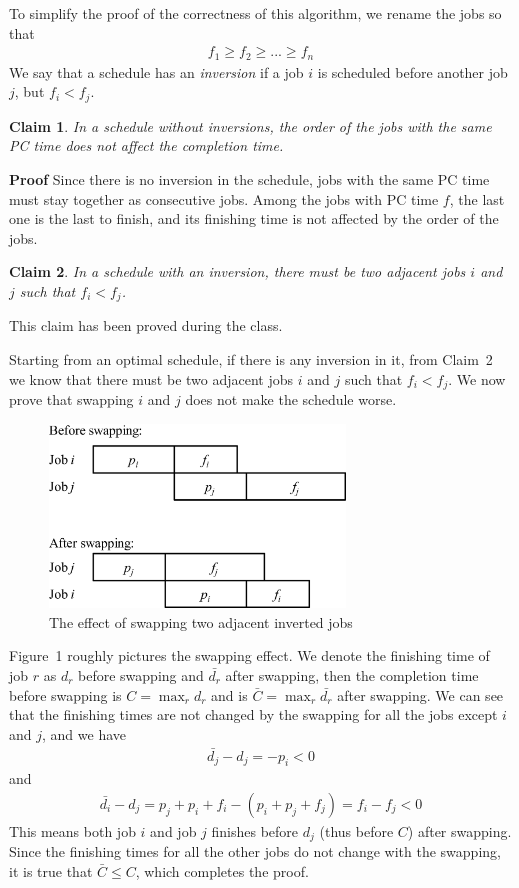 \documentclass[12pt,letterpaper]{article}
\newtheorem{clm}{Claim}
\begin{document}
To simplify the proof of the correctness of this algorithm, we rename the jobs so that 
\begin{align}
f_1 \ge f_2 \ge ... \ge f_n
\end{align}
We say that a schedule has an \emph{inversion} if a job $i$ is scheduled before another job $j$, but $f_i < f_j$.

\begin{clm}
In a schedule without inversions, the order of the jobs with the same PC time does not affect the completion time.
\end{clm}
\textbf{Proof} Since there is no inversion in the schedule, jobs with the same PC time must stay together as consecutive jobs. Among the jobs with PC time $f$, the last one is the last to finish, and its finishing time is not affected by the order of the jobs.

\begin{clm}
In a schedule with an inversion, there must be two adjacent jobs $i$ and $j$ such that $f_i < f_j$.
\end{clm}
This claim has been proved during the class.

Starting from an optimal schedule, if there is any inversion in it, from Claim~2 we know that there must be two adjacent jobs $i$ and $j$ such that $f_i < f_j$. We now prove that swapping $i$ and $j$ does not make the schedule worse.

\begin{figure}
\begin{center}
\includegraphics[width=0.7\textwidth]{4.7.eps}
\caption{The effect of swapping two adjacent inverted jobs}
\end{center}
\end{figure}
Figure~1 roughly pictures the swapping effect. We denote the finishing time of job $r$ as $d_r$ before swapping and $\bar{d_r}$ after swapping, then the completion time before swapping is $C=\max_r{d_r}$ and is $\bar{C}=\max_r{\bar{d_r}}$ after swapping. We can see that the finishing times are not changed by the swapping for all the jobs except $i$ and $j$, and we have
\begin{align}
\bar{d_j}-d_j = -p_i < 0
\end{align}
and
\begin{align}
\bar{d_i}-d_j = p_j+p_i+f_i-(p_i+p_j+f_j) = f_i - f_j < 0
\end{align}
This means both job $i$ and job $j$ finishes before $d_j$ (thus before $C$) after swapping. Since the finishing times for all the other jobs do not change with the swapping, it is true that $\bar{C}\le C$, which completes the proof.
\end{document}
